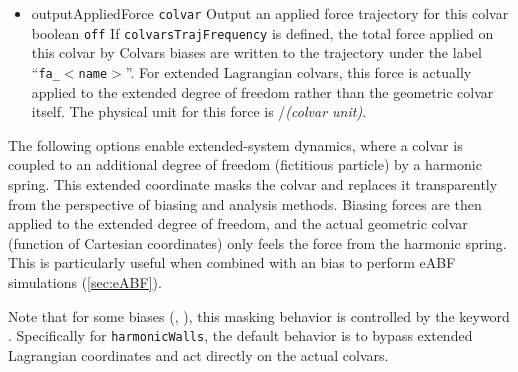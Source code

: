 \begin{itemize}
\item %
  \keydef
    {outputAppliedForce}{%
    \texttt{colvar}}{%
    Output an applied force trajectory for this
    colvar}{%
    boolean}{%
    \texttt{off}}{%
    If \texttt{colvarsTrajFrequency} is defined, the total force
    applied on this colvar by Colvars biases are
    written to the trajectory under the label
    ``\texttt{fa\_}$<$\texttt{name}$>$''.
    For extended Lagrangian colvars, this force is actually applied to the
    extended degree of freedom rather than the geometric colvar itself.
    The physical unit for this
    force is \energyunit/\textit{(colvar unit)}.}

\end{itemize}



The following options enable extended-system
dynamics, where a colvar is coupled to an additional degree of freedom
(fictitious particle) by a harmonic spring.
This extended coordinate masks the colvar and replaces it transparently from
the perspective of biasing and analysis methods.
Biasing forces are then applied to the extended degree
of freedom, and the actual geometric colvar (function of Cartesian
coordinates) only feels the force from the harmonic spring.
This is particularly useful when combined with an  bias
to perform eABF simulations (\ref{sec:eABF}).

Note that for some biases (, ),
this masking behavior is controlled by the keyword .
Specifically for \texttt{harmonicWalls}, the default behavior is to bypass extended Lagrangian
coordinates and act directly on the actual colvars.


